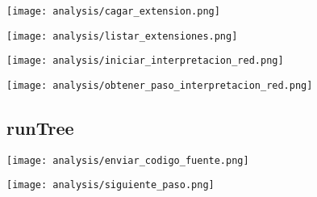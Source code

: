 \pagebreak

\begin{multicols}{2}
\begin{center}
\texttt{[image: analysis/cagar\_extension.png]} 
\end{center}
\columnbreak
\begin{center}
\texttt{[image: analysis/listar\_extensiones.png]} 
\end{center}
\end{multicols}

\begin{multicols}{2}
\begin{center}
\texttt{[image: analysis/iniciar\_interpretacion\_red.png]} 
\end{center}
\columnbreak
\begin{center}
\texttt{[image: analysis/obtener\_paso\_interpretacion\_red.png]} 
\end{center}
\end{multicols}

\subsection{runTree}

\begin{multicols}{2}
\begin{center}
\texttt{[image: analysis/enviar\_codigo\_fuente.png]} 
\end{center}
\columnbreak
\begin{center}
\texttt{[image: analysis/siguiente\_paso.png]} 
\end{center}
\end{multicols}

